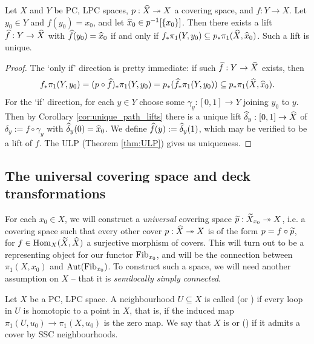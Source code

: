\begin{cor}
	\label{cor:lifting_criterion}
	Let $X$ and $Y$ be PC, LPC spaces, $p: \widehat{X} \twoheadrightarrow X$ a covering space, and $f: Y \to X$. Let $y_0 \in Y$ and $f(y_0) = x_0$, and let $\widehat{x}_0 \in p^{-1}[\{x_0\}]$. Then there exists a lift $\widehat{f} : Y \to \widehat{X}$ with $\widehat{f}(y_0)=\widehat{x}_0$ if and only if $f_*\pi_1(Y, y_0) \subseteq p_* \pi_1(\widehat{X}, \widehat{x}_0)$. Such a lift is unique.
\end{cor}
\begin{proof}
	The `only if' direction is pretty immediate: if such $\widehat{f} : Y \to \widehat{X}$ exists, then
	\[
		f_* \pi_1(Y, y_0) = (p \circ \widehat{f})_* \pi_1(Y, y_0) = p_* (\widehat{f}_* \pi_1(Y, y_0)) \subseteq p_* \pi_1(\widehat{X}, \widehat{x}_0).
	\]
	For the `if' direction, for each $y \in Y$ choose some $\gamma_y : [0,1] \to Y$ joining $y_0$ to $y$. Then by Corollary \ref{cor:unique_path_lifts} there is a unique lift $\widehat{\delta}_y : [0,1] \to \widehat{X}$ of $\delta_y := f \circ \gamma_y$ with $\widehat{\delta}_y(0) = \widehat{x}_0$. We define $\widehat{f}(y) := \widehat{\delta}_y (1)$, which may be verified to be a lift of $f$. The ULP (Theorem \ref{thm:ULP}) gives us uniqueness.
\end{proof}


\subsection{The universal covering space and deck transformations}
\label{subsec:3_3_universal_covering_space}
For each $x_0 \in X$, we will construct a \emph{universal} covering space $\widetilde{p} : \widetilde{X}_{x_0} \twoheadrightarrow X$, i.e. a covering space such that every other cover $p : \widehat{X} \twoheadrightarrow X$ is of the form $p = f \circ \widetilde{p}$, for $f \in \mathrm{Hom}_X(\widetilde{X}, \widehat{X})$ a surjective morphism of covers. This will turn out to be a representing object for our functor $\mathrm{Fib}_{x_0}$, and will be the connection between $\pi_1(X, x_0)$ and $\mathrm{Aut}(\mathrm{Fib}_{x_0})$. To construct such a space, we will need another assumption on $X$ -- that it is \emph{semilocally simply connected}.

\begin{defn}
	Let $X$ be a PC, LPC space. A neighbourhood $U \subseteq X$ is called  (or ) if every loop in $U$ is homotopic to a point in $X$, that is, if the induced map $\pi_1(U, u_0) \to \pi_1(X, u_0)$ is the zero map. We say that $X$ is  or () if it admits a cover by SSC neighbourhoods.
\end{defn}

